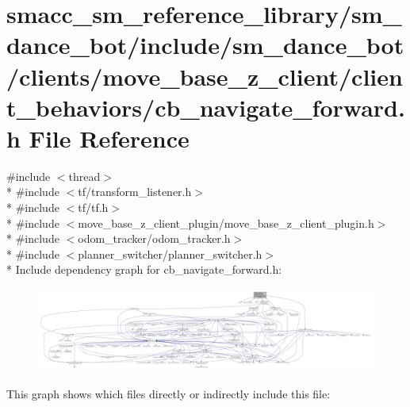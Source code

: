 \hypertarget{smacc__sm__reference__library_2sm__dance__bot_2include_2sm__dance__bot_2clients_2move__base__z__af7739851e4ad3a8f288f51062fe894a}{}\section{smacc\+\_\+sm\+\_\+reference\+\_\+library/sm\+\_\+dance\+\_\+bot/include/sm\+\_\+dance\+\_\+bot/clients/move\+\_\+base\+\_\+z\+\_\+client/client\+\_\+behaviors/cb\+\_\+navigate\+\_\+forward.h File Reference}
\label{smacc__sm__reference__library_2sm__dance__bot_2include_2sm__dance__bot_2clients_2move__base__z__af7739851e4ad3a8f288f51062fe894a}
{\ttfamily \#include $<$thread$>$}\\*
{\ttfamily \#include $<$tf/transform\+\_\+listener.\+h$>$}\\*
{\ttfamily \#include $<$tf/tf.\+h$>$}\\*
{\ttfamily \#include $<$move\+\_\+base\+\_\+z\+\_\+client\+\_\+plugin/move\+\_\+base\+\_\+z\+\_\+client\+\_\+plugin.\+h$>$}\\*
{\ttfamily \#include $<$odom\+\_\+tracker/odom\+\_\+tracker.\+h$>$}\\*
{\ttfamily \#include $<$planner\+\_\+switcher/planner\+\_\+switcher.\+h$>$}\\*
Include dependency graph for cb\+\_\+navigate\+\_\+forward.\+h\+:
\nopagebreak
\begin{figure}[H]
\begin{center}
\leavevmode
\includegraphics[width=350pt]{smacc__sm__reference__library_2sm__dance__bot_2include_2sm__dance__bot_2clients_2move__base__z__04f94dc33462d13f31b9ed7997f06b9f}
\end{center}
\end{figure}
This graph shows which files directly or indirectly include this file\+:
\nopagebreak
